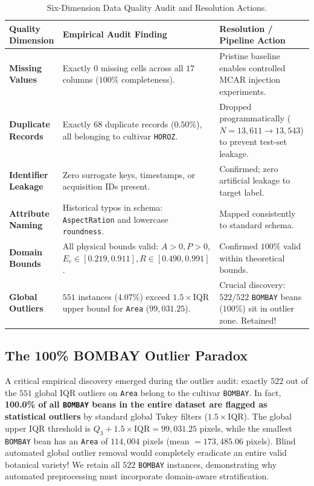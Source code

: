 \documentclass[11pt,a4paper]{article}
\begin{document}
\begin{table}[htbp]
    \centering
    \small
    \caption{Six-Dimension Data Quality Audit and Resolution Actions.}
    \label{tab:data_quality}
    \setlength{\tabcolsep}{5pt}
    \begin{tabularx}{\linewidth}{@{} l >{\raggedright\arraybackslash}p{4.8cm} >{\raggedright\arraybackslash}X @{}}
        \toprule
        \textbf{Quality Dimension} & \textbf{Empirical Audit Finding} & \textbf{Resolution / Pipeline Action} \\
        \midrule
        \textbf{Missing Values} & Exactly $0$ missing cells across all $17$ columns ($100\%$ completeness). & Pristine baseline enables controlled MCAR injection experiments. \\
        \textbf{Duplicate Records} & Exactly $68$ duplicate records ($0.50\%$), all belonging to cultivar \texttt{HOROZ}. & Dropped programmatically ($N = 13{,}611 \to 13{,}543$) to prevent test-set leakage. \\
        \textbf{Identifier Leakage} & Zero surrogate keys, timestamps, or acquisition IDs present. & Confirmed; zero artificial leakage to target label. \\
        \textbf{Attribute Naming} & Historical typos in schema: \texttt{AspectRation} and lowercase \texttt{roundness}. & Mapped consistently to standard schema. \\
        \textbf{Domain Bounds} & All physical bounds valid: $A > 0, P > 0$, $E_c \in [0.219, 0.911], R \in [0.490, 0.991]$. & Confirmed $100\%$ valid within theoretical bounds. \\
        \textbf{Global Outliers} & $551$ instances ($4.07\%$) exceed $1.5\times\text{IQR}$ upper bound for \texttt{Area} ($99{,}031.25$). & Crucial discovery: $522/522$ \texttt{BOMBAY} beans ($100\%$) sit in outlier zone. Retained! \\
        \bottomrule
    \end{tabularx}
\end{table}

\subsection{The 100\% BOMBAY Outlier Paradox}
\label{subsec:bombay_outlier_paradox}

A critical empirical discovery emerged during the outlier audit: exactly $522$ out of the $551$ global IQR outliers on \texttt{Area} belong to the cultivar \texttt{BOMBAY}. In fact, \textbf{100.0\% of all \texttt{BOMBAY} beans in the entire dataset are flagged as statistical outliers} by standard global Tukey filters ($1.5\times\text{IQR}$). The global upper IQR threshold is $Q_3 + 1.5\times\text{IQR} = 99{,}031.25$ pixels, while the smallest \texttt{BOMBAY} bean has an \texttt{Area} of $114{,}004$ pixels (mean $= 173{,}485.06$ pixels). Blind automated global outlier removal would completely eradicate an entire valid botanical variety! We retain all $522$ \texttt{BOMBAY} instances, demonstrating why automated preprocessing must incorporate domain-aware stratification.
\end{document}
